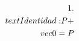 \documentclass[preview]{standalone}
\begin{document}
\begin{align*}
\special{dvisvgm:raw <g id='unique000'>}1. \\text{ Identidad: } P + \\vec{0} = P\special{dvisvgm:raw </g>}
\end{align*}
\end{document}
